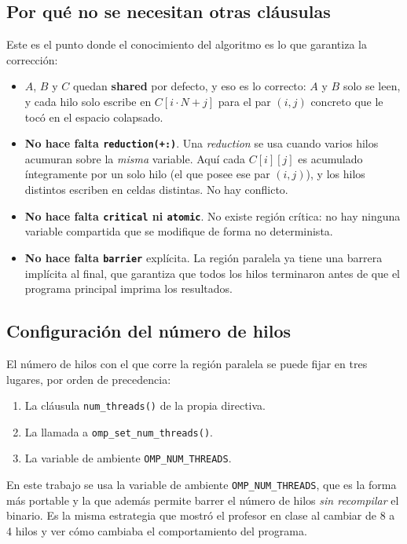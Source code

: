 \subsection{Por qué no se necesitan otras cláusulas}

Este es el punto donde el conocimiento del algoritmo es lo que garantiza la corrección:

\begin{itemize}
    \item $A$, $B$ y $C$ quedan \textbf{shared} por defecto, y eso es lo correcto: $A$ y $B$ solo se leen, y cada hilo solo escribe en $C[i \cdot N + j]$ para el par $(i,j)$ concreto que le tocó en el espacio colapsado.
    \item \textbf{No hace falta \texttt{reduction(+:)}}. Una \textit{reduction} se usa cuando varios hilos acumuran sobre la \emph{misma} variable. Aquí cada $C[i][j]$ es acumulado íntegramente por un solo hilo (el que posee ese par $(i,j)$), y los hilos distintos escriben en celdas distintas. No hay conflicto.
    \item \textbf{No hace falta \texttt{critical} ni \texttt{atomic}}. No existe región crítica: no hay ninguna variable compartida que se modifique de forma no determinista.
    \item \textbf{No hace falta \texttt{barrier}} explícita. La región paralela ya tiene una barrera implícita al final, que garantiza que todos los hilos terminaron antes de que el programa principal imprima los resultados.
\end{itemize}

\subsection{Configuración del número de hilos}

El número de hilos con el que corre la región paralela se puede fijar en tres lugares, por orden de precedencia:

\begin{enumerate}
    \item La cláusula \texttt{num\_threads()} de la propia directiva.
    \item La llamada a \texttt{omp\_set\_num\_threads()}.
    \item La variable de ambiente \texttt{OMP\_NUM\_THREADS}.
\end{enumerate}

En este trabajo se usa la variable de ambiente \texttt{OMP\_NUM\_THREADS}, que es la forma más portable y la que además permite barrer el número de hilos \emph{sin recompilar} el binario. Es la misma estrategia que mostró el profesor en clase al cambiar de 8 a 4 hilos y ver cómo cambiaba el comportamiento del programa.

